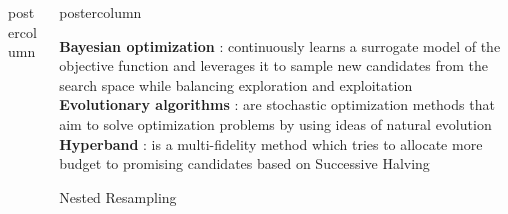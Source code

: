 \documentclass{beamer}
\begin{document}
\begin{frame}[fragile]{}
\begin{columns}
\begin{column}{.31\textwidth}
\begin{beamercolorbox}[center]{postercolumn}
\begin{minipage}{.98\textwidth}
{%
				}
			\end{minipage}
		\end{beamercolorbox}
	\end{column}
	\begin{column}{.31\textwidth}
		\begin{beamercolorbox}[center]{postercolumn}
			\begin{minipage}{.98\textwidth}
				\parbox[t][\columnheight]{\textwidth}{



\textbf{Bayesian optimization} : continuously learns a surrogate model of the objective function and leverages it to sample new candidates from the search space while balancing exploration and exploitation\\

\textbf{Evolutionary algorithms} : are stochastic optimization methods that aim to solve optimization problems by using ideas of natural evolution\\

\textbf{Hyperband} : is a multi-fidelity method which tries to allocate more budget to promising candidates based on Successive Halving \\

\begin{myblock}{Nested Resampling}


\end{myblock}}
\end{minipage}
\end{beamercolorbox}
\end{column}
\end{columns}
\end{frame}
\end{document}
